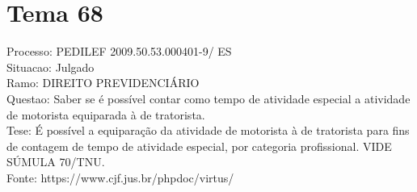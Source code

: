 \documentclass[12pt]{article}
\begin{document}
\section*{Tema 68}
Processo: PEDILEF 2009.50.53.000401-9/ ES\\
Situacao: Julgado\\
Ramo: DIREITO PREVIDENCIÁRIO\\
Questao: Saber se é possível contar como tempo de atividade especial a atividade de motorista equiparada à de tratorista.\\
Tese: É possível a equiparação da atividade de motorista à de tratorista para fins de contagem de tempo de atividade especial, por categoria profissional. VIDE SÚMULA 70/TNU.\\
Fonte: https://www.cjf.jus.br/phpdoc/virtus/
\end{document}
